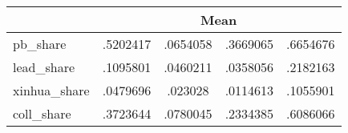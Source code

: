 {
\def\sym#1{\ifmmode^{#1}\else\(^{#1}\)\fi}
\begin{tabular}{l*{1}{cccc}}
\hline\hline
            &\multicolumn{4}{c}{Mean}                           \\
\hline
pb\_share    &    .5202417&    .0654058&    .3669065&    .6654676\\
lead\_share  &    .1095801&    .0460211&    .0358056&    .2182163\\
xinhua\_share&    .0479696&     .023028&    .0114613&    .1055901\\
coll\_share  &    .3723644&    .0780045&    .2334385&    .6086066\\
\hline\hline
\end{tabular}
}
